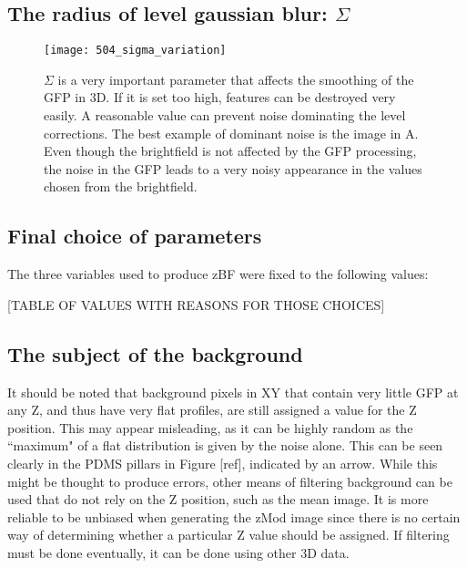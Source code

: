 \subsection{The radius of level gaussian blur: $\Sigma$}

\begin{figure}[h!]
 \centering
 \texttt{[image: 504\_sigma\_variation]}
 \caption[Varying $\Sigma$]{
 	$\Sigma$ is a very important parameter that affects the smoothing of the GFP in 3D. If it is set too high, features can be destroyed very easily. A reasonable value can prevent noise dominating the level corrections. The best example of dominant noise is the image in A. Even though the brightfield is not affected by the GFP processing, the noise in the GFP leads to a very noisy appearance in the values chosen from the brightfield.
 }
 \label{fig:sigmavariation}
\end{figure}

\subsection{Final choice of parameters}

The three variables used to produce zBF were fixed to the following values:

[TABLE OF VALUES WITH REASONS FOR THOSE CHOICES]

\subsection{The subject of the background}

It should be noted that background pixels in XY that contain very little GFP at any Z, and thus have very flat profiles, are still assigned a value for the Z position. This may appear misleading, as it can be highly random as the ``maximum" of a flat distribution is given by the noise alone. This can be seen clearly in the PDMS pillars in Figure [ref], indicated by an arrow. While this might be thought to produce errors, other means of filtering background can be used that do not rely on the Z position, such as the mean image. It is more reliable to be unbiased when generating the zMod image since there is no certain way of determining whether a particular Z value should be assigned. If filtering must be done eventually, it can be done using other 3D data.

